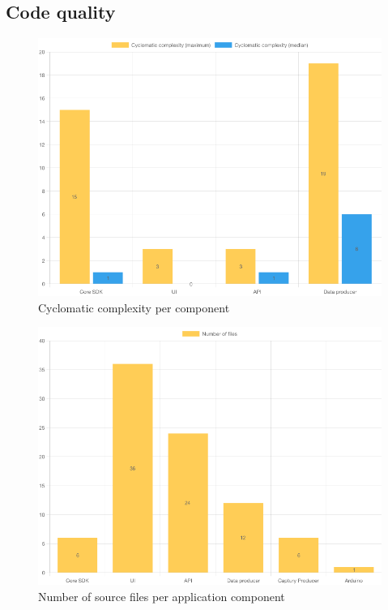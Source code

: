 \subsection{Code quality}

\begin{figure}[h]
\centering
\includegraphics[scale=0.5]{04_Artefakte/01_Abbildungen/code-stats-complexity}
\caption[Cyclomatic complexity]{Cyclomatic complexity per component\protect}
\label{fig:cyclomaticComplexity}
\end{figure}

\begin{figure}[h]
\centering
\includegraphics[scale=0.5]{04_Artefakte/01_Abbildungen/code-stats-filecount}
\caption[File count]{Number of source files per application component\protect}
\label{fig:fileCount}
\end{figure}

